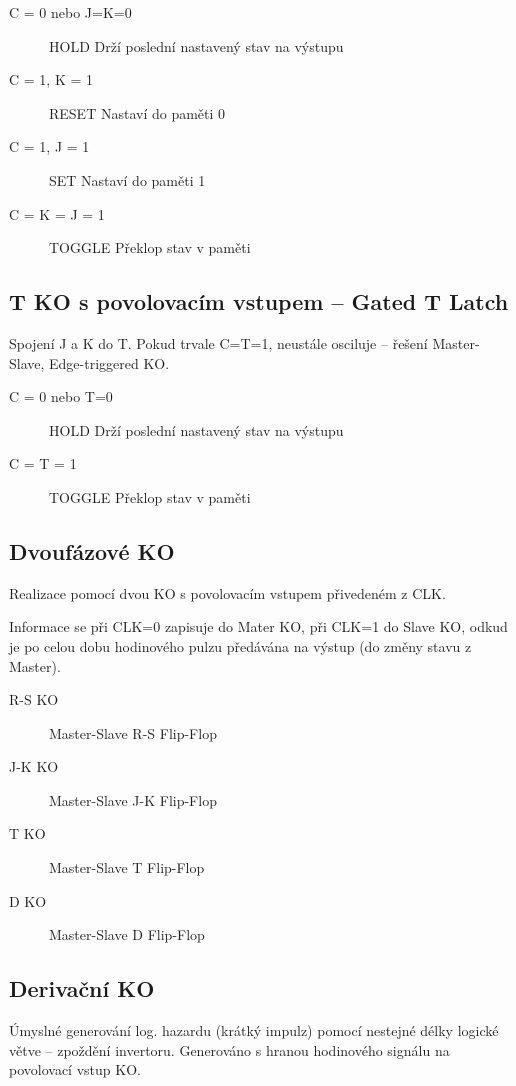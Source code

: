 \documentclass[a4paper, 11pt]{report}
\begin{document}
\begin{description}
	\item[C = 0 nebo J=K=0] HOLD Drží poslední nastavený stav na výstupu
	\item[C = 1, K = 1] RESET Nastaví do paměti 0
	\item[C = 1, J = 1] SET Nastaví do paměti 1
	\item[C = K = J = 1] TOGGLE Překlop stav v paměti
\end{description}

\subsection{T KO s povolovacím vstupem -- Gated T Latch}

Spojení J a K do T. Pokud trvale C=T=1, neustále osciluje -- řešení Master-Slave, Edge-triggered KO.

\begin{description}
	\item[C = 0 nebo T=0] HOLD Drží poslední nastavený stav na výstupu
	\item[C = T = 1] TOGGLE Překlop stav v paměti
\end{description}

\subsection{Dvoufázové KO}

Realizace pomocí dvou KO s povolovacím vstupem přivedeném z CLK.

Informace se při CLK=0 zapisuje do Mater KO, při CLK=1 do Slave KO, odkud je po celou dobu hodinového pulzu předávána na výstup (do změny stavu z Master).

\begin{description}
	\item[R-S KO] Master-Slave R-S Flip-Flop
	\item[J-K KO] Master-Slave J-K Flip-Flop
	\item[T KO] Master-Slave T Flip-Flop
	\item[D KO] Master-Slave D Flip-Flop
\end{description}

\subsection{Derivační KO}

Úmyslné generování log. hazardu (krátký impulz) pomocí nestejné délky logické větve -- zpoždění invertoru. Generováno s hranou hodinového signálu na povolovací vstup KO.
\end{document}
